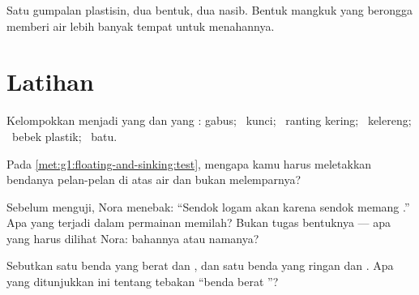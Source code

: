 \begin{omfigure}

{\small Satu gumpalan plastisin, dua bentuk, dua nasib. Bentuk mangkuk
yang berongga memberi air lebih banyak tempat untuk menahannya.}
\end{omfigure}

\section{Latihan}

\begin{exercise}[$\star$]\label{exo:g1:floating-and-sinking:1}
Kelompokkan menjadi yang  dan yang : gabus; \ kunci;
\ ranting kering; \ kelereng; \ bebek plastik; \ batu.
\end{exercise}

\begin{exercise}[$\star$]\label{exo:g1:floating-and-sinking:2}
Pada \cref{met:g1:floating-and-sinking:test}, mengapa kamu harus
meletakkan bendanya pelan-pelan di atas air dan bukan melemparnya?
\end{exercise}

\begin{exercise}[$\star$]\label{exo:g1:floating-and-sinking:3}
Sebelum menguji, Nora menebak: ``Sendok logam akan  karena
sendok memang .'' Apa yang terjadi dalam permainan memilah?
Bukan tugas bentuknya --- apa yang harus dilihat Nora: bahannya atau
namanya?
\end{exercise}

\begin{exercise}[$\star$]\label{exo:g1:floating-and-sinking:4}
Sebutkan satu benda yang berat dan , dan satu benda yang
ringan dan . Apa yang ditunjukkan ini tentang tebakan ``benda
berat ''?
\end{exercise}

